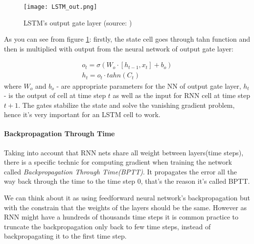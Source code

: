 \begin{figure}[H]
	\texttt{[image: LSTM\_out.png]}
	\caption{
		LSTM's output gate layer (source: \cite{ColahChristopher2015})
		}
	\label{img:lstm_out}
\end{figure}

As you can see from figure \ref{img:lstm_out}: firstly, the state cell goes
through tahn function and then is multiplied
with output from the neural network of output gate layer:

\begin{align} \label{eq:out_gate}
	o_t = \sigma (W_o \cdot [h_{t-1}, x_t] + b_o) \\
	h_t = o_t \cdot tahn(C_t)
\end{align}
where $W_o$ and $b_o$ - are appropriate parameters for the NN of output gate layer,
$h_t$ - is the output of  cell at time step $t$ as well as the input
for RNN cell at time step $t+1$.
The gates stabilize the state and solve the
vanishing gradient problem, hence it's very important for an LSTM
cell to work.\cite{Goodfellow-et-al-2016}

\paragraph{Backpropagation Through Time} Taking into account that RNN nets
share all weight between layers(time steps), there is a specific
technic for computing
gradient when training the network called \emph{Backpropagation Through Time(BPTT)}.
It propagates the error all the way back through the time to the time step 0,
that's the reason it's called \gls{BPTT}. \cite{werbos:bptt}

We can think about it as using feedforward neural network's backpropagation
but with the constrain that the weights of the layers should be the same.
However as RNN might have a hundreds of thousands time steps it is common
practice to truncate the backpropagation only back to few time steps, instead
of backpropagating it to the first time step.


